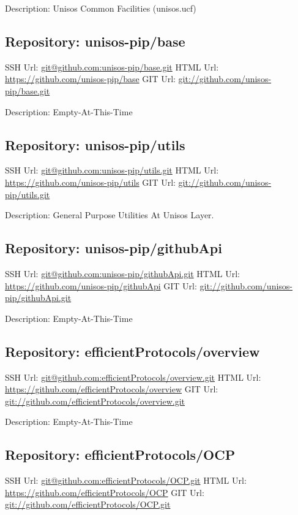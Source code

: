 Description: Unisos Common Facilities (unisos.ucf)

\subsection{Repository: unisos-pip/base}

SSH Url:  \url{git@github.com:unisos-pip/base.git}
HTML Url: \url{https://github.com/unisos-pip/base}
GIT Url:  \url{git://github.com/unisos-pip/base.git}

Description: Empty-At-This-Time

\subsection{Repository: unisos-pip/utils}

SSH Url:  \url{git@github.com:unisos-pip/utils.git}
HTML Url: \url{https://github.com/unisos-pip/utils}
GIT Url:  \url{git://github.com/unisos-pip/utils.git}

Description: General Purpose Utilities At Unisos Layer.

\subsection{Repository: unisos-pip/githubApi}

SSH Url:  \url{git@github.com:unisos-pip/githubApi.git}
HTML Url: \url{https://github.com/unisos-pip/githubApi}
GIT Url:  \url{git://github.com/unisos-pip/githubApi.git}

Description: Empty-At-This-Time

\subsection{Repository: efficientProtocols/overview}

SSH Url:  \url{git@github.com:efficientProtocols/overview.git}
HTML Url: \url{https://github.com/efficientProtocols/overview}
GIT Url:  \url{git://github.com/efficientProtocols/overview.git}

Description: Empty-At-This-Time

\subsection{Repository: efficientProtocols/OCP}

SSH Url:  \url{git@github.com:efficientProtocols/OCP.git}
HTML Url: \url{https://github.com/efficientProtocols/OCP}
GIT Url:  \url{git://github.com/efficientProtocols/OCP.git}

